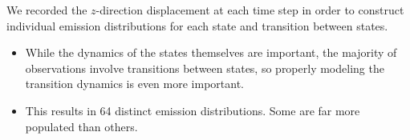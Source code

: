 \documentclass{article}
\begin{document}
  \noindent We recorded the $z$-direction displacement at each time step in order to construct
  individual emission distributions for each state and transition between states.
  \begin{itemize}
    \item While the dynamics of the states themselves are important, the 
    majority of observations involve transitions between states, so properly modeling
    the transition dynamics is even more important.
    \item This results in 64 distinct emission distributions. Some are far more
    populated than others. %
  \end{itemize}
\end{document}
